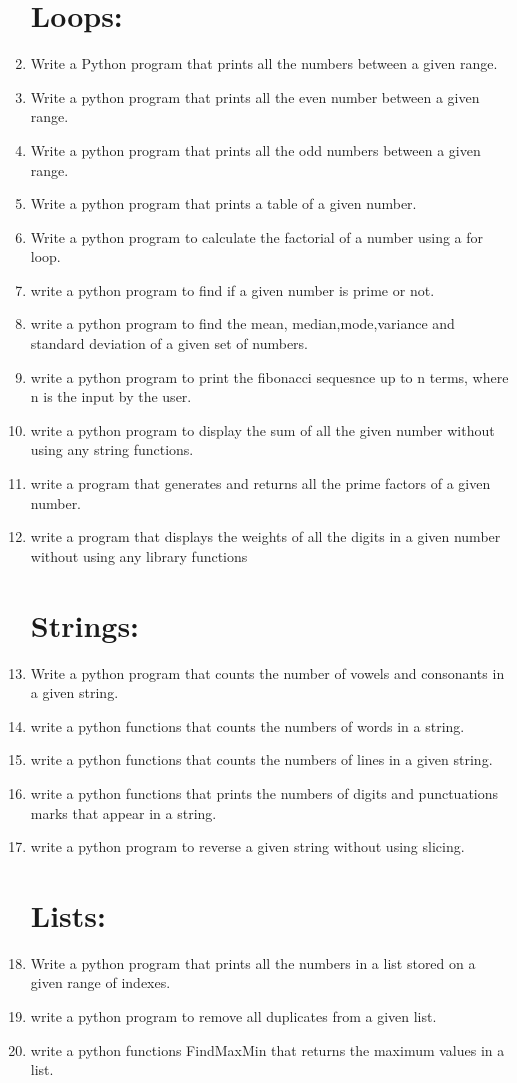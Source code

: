 \documentclass[a4paper,11pt]{article}
\theoremstyle{mytheor}
\begin{document}
\begin{enumerate}
\section{Loops:}
	\item Write a Python program that prints all the numbers between a given range.
	\item Write a python program that prints all the even number between a given range.
	\item Write a python program that prints all the odd numbers between a given range.
	\item Write a python program that prints a table of a given number.
	\item Write a python program to calculate the factorial of a number using a for loop.
	\item write a python program to find if a given number is prime or not.
	\item write a python program to find the mean, median,mode,variance and standard deviation of a given set of numbers.
	\item write a python program to print the fibonacci sequesnce up to n terms, where n  is the input by the user.
	\item write a python program to display the sum of all the given number without using any string functions.
	\item write a program that generates and returns all the prime factors of a given number.
	\item write a program that displays the weights of all the digits in a given number without using any library functions
\section{Strings:}
	\item Write a python program that counts the number of vowels and consonants in a given string.
	\item write a python functions that counts the numbers of words in a string.
	\item write a python functions that counts the numbers of lines in a given string.
	\item write a python functions that prints the numbers of digits and punctuations marks that appear in a string.
	\item write a python program to reverse a given string without using slicing.
	
\section{Lists:}
	\item Write a python program that prints all the numbers in a list stored on a given range of indexes.
	\item write a python program to remove all duplicates from a given list.
	\item write a python functions FindMaxMin that returns the maximum values in a list.

\end{enumerate}
\end{document}
